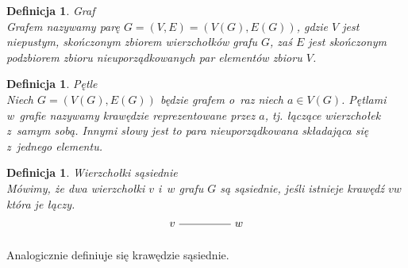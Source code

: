 \documentclass[12pt,a4paper]{report}
\newtheorem{definition}[theorem]{Definicja}
\begin{document}
\begin{definition}{Graf \cite[w o~parciu o~ rozdział 2]{wilson2008}}\\
Grafem nazywamy parę $G=(V,E)=(V(G),E(G))$, gdzie $V$ jest niepustym, skończonym zbiorem wierzchołków grafu $G$, zaś $E$ jest skończonym podzbiorem zbioru nieuporządkowanych par elementów zbioru $V$.
\end{definition}

\begin{definition}{Pętle \cite[Rozdział 2]{wilson2008}}\\
Niech $G=(V(G), E(G))$ będzie grafem o~raz niech $a \in V(G)$. Pętlami w~grafie nazywamy krawędzie reprezentowane przez $a$, tj. łączące wierzchołek z~samym sobą. Innymi słowy jest to para nieuporządkowana składająca się z~jednego elementu.
\end{definition}


\begin{definition}{Wierzchołki sąsiednie \cite[Rozdział 2]{wilson2008}}\\
Mówimy, że dwa wierzchołki $v$ i~$w$ grafu $G$ są sąsiednie, jeśli istnieje krawędź $vw$ która je łączy. 
$$
\begin{tikzpicture}[scale=.7]
  \node (v) at (-2,0) {$v$};
  \node (w) at (1,0) {$w$};
  \draw (v)--(w); 
  
\end{tikzpicture}
$$
\end{definition}
Analogicznie definiuje się krawędzie sąsiednie.
\end{document}
